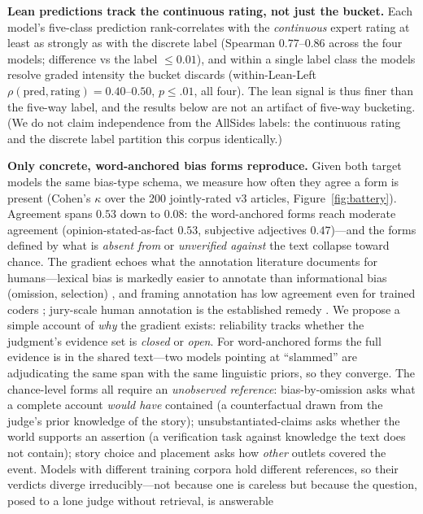\documentclass{article}
\newcommand{\kap}{\kappa}
\begin{document}
\textbf{Lean predictions track the continuous rating, not just the
bucket.} Each model's five-class prediction rank-correlates with the
\emph{continuous} expert rating at least as strongly as with the discrete
label (Spearman $0.77$--$0.86$ across the four models; difference vs the
label $\le 0.01$), and within a single label class the models resolve
graded intensity the bucket discards (within-Lean-Left
$\rho(\text{pred},\text{rating}){=}0.40$--$0.50$, $p\le.01$, all four).
The lean signal is thus finer than the five-way label, and the results
below are not an artifact of five-way bucketing. (We do not claim
independence from the AllSides labels: the continuous rating and the
discrete label partition this corpus identically.)

\textbf{Only concrete, word-anchored bias forms reproduce.} Given both
target models the same bias-type schema, we measure how often they agree
a form is present (Cohen's $\kap$ over the 200 jointly-rated v3
articles, Figure~\ref{fig:battery}). Agreement spans $0.53$ down to
$0.08$: the word-anchored forms reach moderate agreement
(opinion-stated-as-fact $0.53$, subjective adjectives $0.47$)---and the forms defined by what
is \emph{absent from} or \emph{unverified against} the text collapse
toward chance. The gradient echoes what the annotation literature
documents for humans---lexical bias is markedly easier to annotate than
informational bias (omission, selection) \citep{fan2019basil}, and
framing annotation has low agreement even for trained coders
\citep{card2015media}; jury-scale human annotation is the established
remedy \citep{pastorino2025frame}. We propose a simple account of
\emph{why} the gradient exists: reliability tracks whether the
judgment's evidence set is \emph{closed} or \emph{open}. For
word-anchored forms the full evidence is in the shared text---two
models pointing at ``slammed'' are adjudicating the same span with the
same linguistic priors, so they converge. The chance-level forms all
require an \emph{unobserved reference}: bias-by-omission asks what a
complete account \emph{would have} contained (a counterfactual drawn
from the judge's prior knowledge of the story); unsubstantiated-claims
asks whether the world supports an assertion (a verification task
against knowledge the text does not contain); story choice and
placement asks how \emph{other} outlets covered the event. Models with
different training corpora hold different references, so their
verdicts diverge irreducibly---not because one is careless but because
the question, posed to a lone judge without retrieval, is answerable
\end{document}
